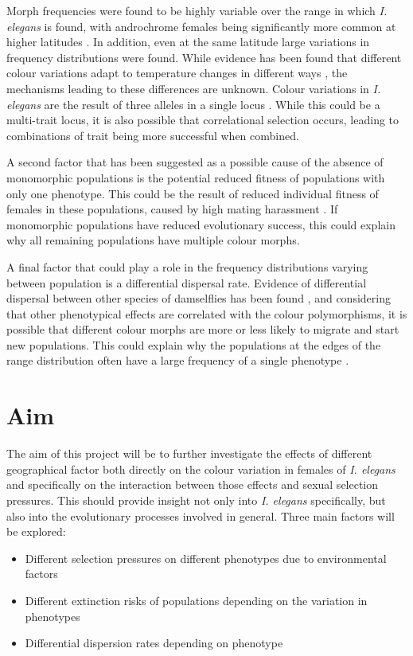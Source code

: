 \documentclass{article}
\begin{document}
Morph frequencies were found to be highly variable over the range in which \textit{I. elegans} is found, with androchrome females being significantly more common at higher latitudes \cite{Gosden2011}. In addition, even at the same latitude large variations in frequency distributions were found. While evidence has been found that different colour variations adapt to temperature changes in different ways \cite{Lancaster2017}, the mechanisms leading to these differences are unknown. Colour variations in \textit{I. elegans} are the result of three alleles in a single locus \cite{Sanchez2005}. While this could be a multi-trait locus, it is also possible that correlational selection occurs, leading to combinations of trait being more successful when combined.

A second factor that has been suggested as a possible cause of the absence of monomorphic populations is the potential reduced fitness of populations with only one phenotype. This could be the result of reduced individual fitness of females in these populations, caused by high mating harassment \cite{Takahashi2014}. If monomorphic populations have reduced evolutionary success, this could explain why all remaining populations have multiple colour morphs.

A final factor that could play a role in the frequency distributions varying between population is a differential dispersal rate. Evidence of differential dispersal between other species of damselflies has been found \cite{mcpeek1989}, and considering that other phenotypical effects are correlated with the colour polymorphisms, it is possible that different colour morphs are more or less likely to migrate and start new populations. This could explain why the populations at the edges of the range distribution often have a large frequency of a single phenotype \cite{Gosden2011}.

\section{Aim}
The aim of this project will be to further investigate the effects of different geographical factor both directly on the colour variation in females of \textit{I. elegans} and specifically on the interaction between those effects and sexual selection pressures. This should provide insight not only into \textit{I. elegans} specifically, but also into the evolutionary processes involved in general. Three main factors will be explored:
\begin{itemize}
    \item Different selection pressures on different phenotypes due to environmental factors
    \item Different extinction risks of populations depending on the variation in phenotypes
    \item Differential dispersion rates depending on phenotype
\end{itemize}
\end{document}
